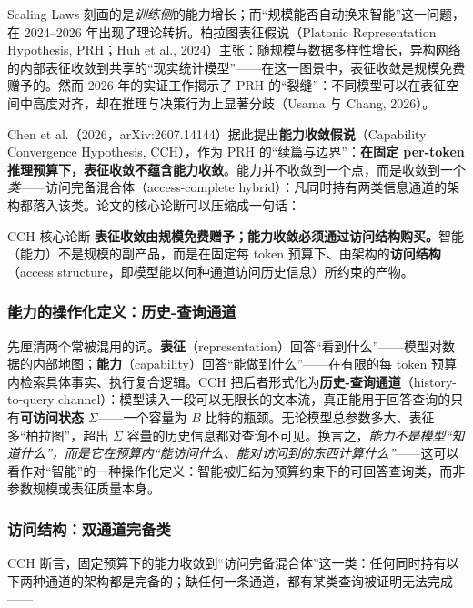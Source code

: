 \documentclass[12pt,a4paper]{article}
\begin{document}
Scaling Laws 刻画的是\emph{训练侧}的能力增长；而“规模能否自动换来智能”这一问题，在 2024--2026 年出现了理论转折。柏拉图表征假说（Platonic Representation Hypothesis, PRH；Huh et al., 2024）主张：随规模与数据多样性增长，异构网络的内部表征收敛到共享的“现实统计模型”——在这一图景中，表征收敛是规模免费赠予的。然而 2026 年的实证工作揭示了 PRH 的“裂缝”：不同模型可以在表征空间中高度对齐，却在推理与决策行为上显著分歧（Usama 与 Chang, 2026）。

Chen et al.（2026，arXiv:2607.14144）据此提出\textbf{能力收敛假说}（Capability Convergence Hypothesis, CCH），作为 PRH 的“续篇与边界”：\textbf{在固定 per-token 推理预算下，表征收敛不蕴含能力收敛}。能力并不收敛到一个点，而是收敛到一个\emph{类}——访问完备混合体（access-complete hybrid）：凡同时持有两类信息通道的架构都落入该类。论文的核心论断可以压缩成一句话：

\begin{keybox}{CCH 核心论断}
\textbf{表征收敛由规模免费赠予；能力收敛必须通过访问结构购买。}智能（能力）不是规模的副产品，而是在固定每 token 预算下、由架构的\textbf{访问结构}（access structure，即模型能以何种通道访问历史信息）所约束的产物。
\end{keybox}

\subsubsection{能力的操作化定义：历史-查询通道}

先厘清两个常被混用的词。\textbf{表征}（representation）回答“看到什么”——模型对数据的内部地图；\textbf{能力}（capability）回答“能做到什么”——在有限的每 token 预算内检索具体事实、执行复合逻辑。CCH 把后者形式化为\textbf{历史-查询通道}（history-to-query channel）：模型读入一段可以无限长的文本流，真正能用于回答查询的只有\textbf{可访问状态} $\Sigma$——一个容量为 $B$ 比特的瓶颈。无论模型总参数多大、表征多“柏拉图”，超出 $\Sigma$ 容量的历史信息都对查询不可见。换言之，\emph{能力不是模型“知道什么”，而是它在预算内“能访问什么、能对访问到的东西计算什么”}——这可以看作对“智能”的一种操作化定义：智能被归结为预算约束下的可回答查询类，而非参数规模或表征质量本身。

\subsubsection{访问结构：双通道完备类}

CCH 断言，固定预算下的能力收敛到“访问完备混合体”这一类：任何同时持有以下两种通道的架构都是完备的；缺任何一条通道，都有某类查询被证明无法完成——
\end{document}
